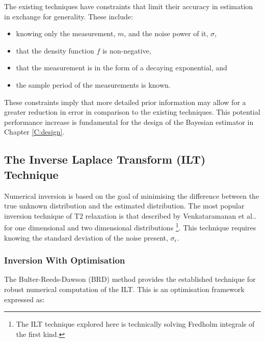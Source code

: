 The existing techniques have constraints that limit their accuracy in estimation in exchange for generality. These include:
\begin{itemize}
    \item knowing only the measurement, $m$, and the noise power of it, $\sigma$, 
    \item that the density function $f$ is non-negative,
    \item that the measurement is in the form of a decaying exponential, and
    \item the sample period of the measurements is known.
\end{itemize}
These constraints imply that more detailed prior information may allow for a greater reduction in error in comparison to the existing techniques. This potential performance increase is fundamental for the design of the Bayesian estimator in Chapter \ref{C:design}.




\subsection{The Inverse Laplace Transform (ILT) Technique} \label{section:ILT}

Numerical inversion is based on the goal of minimising the difference between the true unknown distribution and the estimated distribution. The most popular inversion technique of T2 relaxation is that described by Venkataramanan et al.. for one dimensional and two dimensional distributions \cite{Venk2DFredholm2002} \footnote{The ILT technique explored here is technically solving Fredholm integrals of the first kind.}. This technique requires knowing the standard deviation of the noise present, $\sigma_\epsilon$.

\subsubsection{Inversion With Optimisation}
The Bulter-Reeds-Dawson (BRD) method \cite{BulterReedsDawsonMethod1981} provides the established technique for robust numerical computation of the ILT. This is an optimisation framework expressed as:
    

